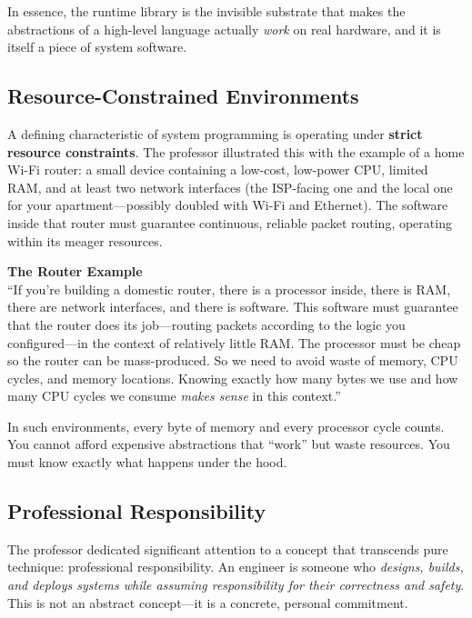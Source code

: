 In essence, the runtime library is the invisible substrate that makes the abstractions of a high-level language actually \emph{work} on real hardware, and it is itself a piece of system software.

\subsection{Resource-Constrained Environments}

A defining characteristic of system programming is operating under \textbf{strict resource constraints}. The professor illustrated this with the example of a home Wi-Fi router: a small device containing a low-cost, low-power CPU, limited RAM, and at least two network interfaces (the ISP-facing one and the local one for your apartment---possibly doubled with Wi-Fi and Ethernet). The software inside that router must guarantee continuous, reliable packet routing, operating within its meager resources.

\begin{insightbox}
\textbf{The Router Example} \\
``If you're building a domestic router, there is a processor inside, there is RAM, there are network interfaces, and there is software. This software must guarantee that the router does its job---routing packets according to the logic you configured---in the context of relatively little RAM. The processor must be cheap so the router can be mass-produced. So we need to avoid waste of memory, CPU cycles, and memory locations. Knowing exactly how many bytes we use and how many CPU cycles we consume \emph{makes sense} in this context.''
\end{insightbox}

In such environments, every byte of memory and every processor cycle counts. You cannot afford expensive abstractions that ``work'' but waste resources. You must know exactly what happens under the hood.

\subsection{Professional Responsibility}

The professor dedicated significant attention to a concept that transcends pure technique: professional responsibility. An engineer is someone who \emph{designs, builds, and deploys systems while assuming responsibility for their correctness and safety}. This is not an abstract concept---it is a concrete, personal commitment.

